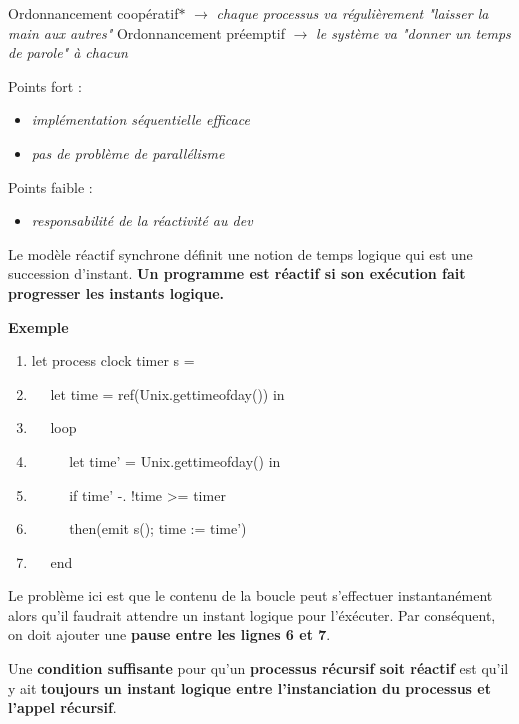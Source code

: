 \documentclass[10pt,a4paper]{article}
\begin{document}
				
				Ordonnancement coopératif$\ast$ $\longrightarrow$ \textit{\small{chaque processus va r\'{e}guli\`{e}rement "laisser la main aux autres"}}
				\smallbreak
				Ordonnancement pr\'{e}emptif $\longrightarrow$ \textit{\small{le syst\`{e}me va "donner un temps de parole" \`{a} chacun}}
				\medbreak
					
				Points fort :
				\begin{itemize}
					\item \textit{\small{impl\'{e}mentation s\'{e}quentielle efficace}}
					\item \textit{\small{pas de probl\`{e}me de parall\'{e}lisme}}
				\end{itemize}
				\medbreak
					
				Points faible : 
				\begin{itemize}
					\item \textit{\small{responsabilit\'{e} de la r\'{e}activit\'{e} au dev}}
				\end{itemize}
				\medbreak
					
				Le mod\`{e}le r\'{e}actif synchrone d\'{e}finit une notion de temps logique qui est une succession d'instant.
				\smallbreak
				\textbf{Un programme est r\'{e}actif si son ex\'{e}cution fait progresser les instants logique.}
				\medbreak
					
				\textbf{Exemple}
				\medbreak
					
				\begin{enumerate}
				 	\item let process clock timer s =
				 	\item $\quad$ let time = ref(Unix.gettimeofday()) in
				 	\item $\quad$ loop
				 	\item $\quad$ $\quad$ let time' = Unix.gettimeofday() in
				 	\item $\quad$ $\quad$ if time' -. !time >= timer
				 	\item $\quad$ $\quad$ then(emit s(); time := time')
				 	\item $\quad$ end 
			 	\end{enumerate}
				\medbreak
					
				Le probl\`{e}me ici est que le contenu de la boucle peut s'effectuer instantan\'{e}ment alors qu'il faudrait attendre un instant logique pour l'éxécuter. Par conséquent, on doit ajouter une \textbf{pause entre les lignes 6 et 7}.
				\bigbreak
					
				Une \textbf{condition suffisante} pour qu'un \textbf{processus r\'{e}cursif soit r\'{e}actif} est qu'il y ait \textbf{toujours} \textbf{un instant logique entre l'instanciation du processus et l'appel r\'{e}cursif}.
				\bigbreak
					
\end{document}
